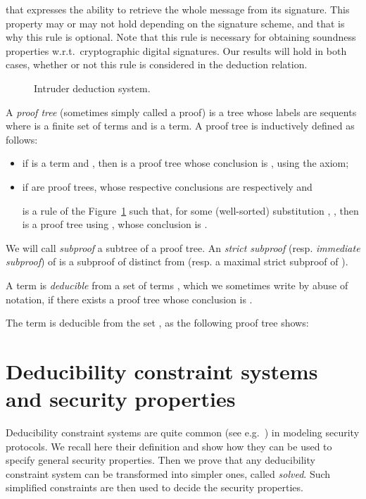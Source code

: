 \documentclass[acmtocl,acmnow]{acmtrans2m}
\newcommand{\dedsys}[1]{deducibility constraint system}
\newcommand{\Dedsyss}[1]{Deducibility constraint systems}
\begin{document}
that expresses the ability to retrieve the whole message from
its signature. This property may or may not hold depending on the
signature scheme, and that is why this rule is optional. Note that
this rule is necessary for
obtaining soundness properties w.r.t.~cryptographic digital signatures. Our
results will hold in both cases,
whether or not this rule is considered in the deduction relation.


\begin{figure}[t]

\caption{Intruder deduction system.}
\label{fig:deduction}
\end{figure}

A \emph{proof tree} (sometimes simply called a proof) is a tree whose
labels are sequents  where  is a finite set of terms
and  is a term. A proof tree is inductively
defined as follows:
\begin{itemize}
\item if  is a term and , then  is a proof tree
whose conclusion is , using the axiom;
\item if  are proof trees, whose respective conclusions
are  respectively and

is a rule  of the Figure~\ref{fig:deduction} such
that, for some (well-sorted) substitution , 
, then   
is a proof tree using , whose conclusion is .
\end{itemize}
We will call \emph{subproof} a subtree of a proof tree. An \emph{strict subproof}
(resp. \emph{immediate subproof}) of  is a subproof of  distinct
from  (resp. a maximal strict subproof of ). 


A term  is \emph{deducible} from a set of terms , which we sometimes
write  by abuse of notation, if there exists a proof tree
whose conclusion is .

\begin{example}
The term  is deducible from the set ,
as the following proof tree shows:

\end{example}

\section{\Dedsyss{} and security properties}
Deducibility constraint systems
are quite common (see e.g.~\cite{MS01,CS03}) in modeling security protocols. 
 We recall
here their definition and show how they can be used to specify general security properties. Then we prove that
any \dedsys{} can be transformed into  simpler ones, called \emph{solved}. Such simplified constraints are then used to decide the security
properties.
\end{document}
